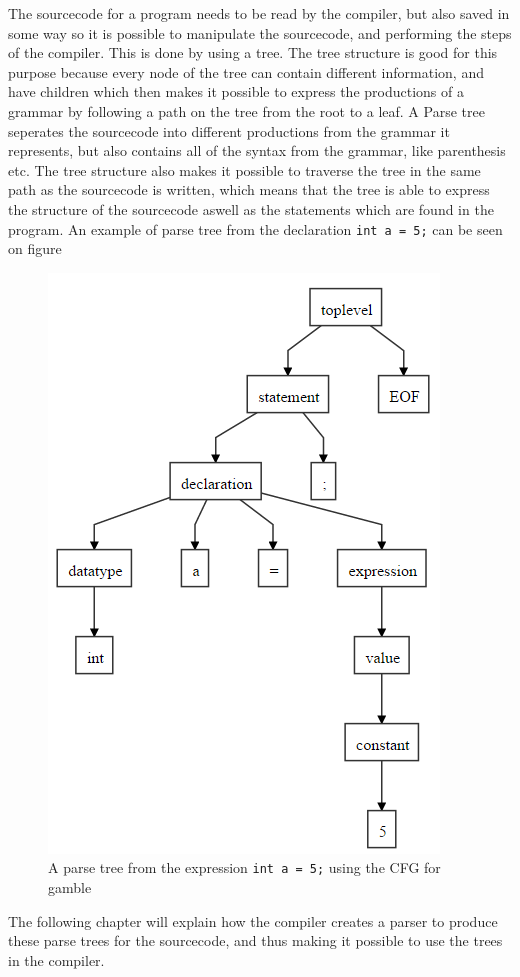 \label{SourceCodeAsTrees}
The sourcecode for a program needs to be read by the compiler, but also saved in some way so it is possible to manipulate the sourcecode, and performing the steps of the compiler.
This is done by using a tree.
The tree structure is good for this purpose because every node of the tree can contain different information, and have children which then makes it possible to express the productions of a grammar by following a path on the tree from the root to a leaf.
A Parse tree seperates the sourcecode into different productions from the grammar it represents, but also contains all of the syntax from the grammar, like parenthesis etc.
The tree structure also makes it possible to traverse the tree in the same path as the sourcecode is written, which means that the tree is able to express the structure of the sourcecode aswell as the statements which are found in the program.
An example of parse tree from the declaration \texttt{int a = 5;} can be seen on figure 

\begin{figure}
		\centering
	 	\includegraphics[width=0.6\linewidth]{figures/Trees/PST.PNG}
		\caption{A parse tree from the expression \texttt{int a = 5;} using the CFG for \gls{gamble}} \label{image:PST}
\end{figure}

The following chapter will explain how the compiler creates a parser to produce these parse trees for the sourcecode, and thus making it possible to use the trees in the compiler.
